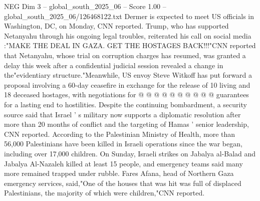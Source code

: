 \begin{textsample}{NEG Dim 3 – global\_south\_2025\_06 – Score 1.00 – global\_south\_2025\_06/126468122.txt}
Dermer is expected to meet US officials in Washington, DC, on Monday, CNN reported.
Trump, who has supported Netanyahu through his ongoing legal troubles, reiterated his call on social media :"MAKE THE DEAL IN GAZA.
GET THE HOSTAGES BACK!!!"CNN reported that Netanyahu, whose trial on corruption charges has resumed, was granted a delay this week after a confidential judicial session revealed a change in the"evidentiary structure."Meanwhile, US envoy Steve Witkoff has put forward a proposal involving a 60-day ceasefire in exchange for the release of 10 living and 18 deceased hostages, with negotiations for @ @ @ @ @ @ @ @ @ @ guarantees for a lasting end to hostilities.
Despite the continuing bombardment, a security source said that Israel ' s military now supports a diplomatic resolution after more than 20 months of conflict and the targeting of Hamas ' senior leadership, CNN reported.
According to the Palestinian Ministry of Health, more than 56,000 Palestinians have been killed in Israeli operations since the war began, including over 17,000 children.
On Sunday, Israeli strikes on Jabalya al-Balad and Jabalya Al-Nazaleh killed at least 15 people, and emergency teams said many more remained trapped under rubble.
Fares Afana, head of Northern Gaza emergency services, said,"One of the houses that was hit was full of displaced Palestinians, the majority of which were children,"CNN reported.

\end{textsample}
